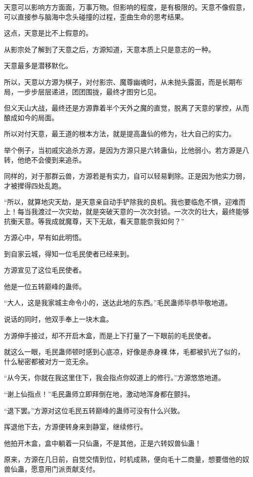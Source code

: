 \begin{this_body}
天意可以影响方方面面，万事万物。但影响的程度，是有极限的。天意不像假意，可以直接参与脑海中念头碰撞的过程，歪曲生命的思考结果。

这点，天意是比不上假意的。

从影宗处了解到了天意之后，方源知道，天意本质上只是意志的一种。

天意最多是潜移默化。

所以，天意以方源为棋子，对付影宗、魔尊幽魂时，从未抛头露面，而是长期布局，一步步层层递进，团团围拢，最终才图穷匕见。

但义天山大战，最终还是方源靠着半个天外之魔的直觉，脱离了天意的掌控，从而酿成如今的局面。

所以对付天意，最王道的根本方法，就是提高蛊仙的修为，壮大自己的实力。

举个例子，当初戚灾追杀方源，是因为方源只是六转蛊仙，比他弱小。若方源是八转，他绝不会傻到来追杀。

同样的，对于那群云兽，方源若是有实力，自可以轻易剿除。正是因为他实力弱，才被撵得四处乱跑。

“所以，就算地灾天劫，是天意亲自动手铲除我的良机。我也要临危不惧，迎难而上！每当我渡过一次灾劫，就是突破天意的一次次封锁。一次次的壮大，最终能够抗衡天意。等我成就魔尊，天下无敌，看天意能奈我如何？”

方源心中，早有如此明悟。

到自家云城，得知一位毛民使者已经来到。

方源宣见了这位毛民使者。

他是一位五转巅峰的蛊师。

“大人，这是我家城主命令小的，送达此地的东西。”毛民蛊师毕恭毕敬地道。

说话的同时，他双手奉上一块木盒。

方源伸手接过，却不开启木盒，而是上下打量了一下眼前的毛民使者。

就这么一眼，毛民蛊师顿时感到心底凉，好像是赤身裸.体，毛都被扒光了似的，什么秘密都被对方一览无余。

“从今天，你就在我这里住下，我会指点你奴道上的修行。”方源悠悠地道。

“谢上仙指点！”毛民蛊师立即拜倒在地，激动地浑身都在颤抖。

“退下罢。”方源对这位毛民五转巅峰的蛊师可没有什么兴致。

挥退他下去，方源便转身来到静室，继续修行。

他拍开木盒，盒中躺着一只仙蛊，不是其他，正是六转奴兽仙蛊！

原来，方源在几日前，自觉交情到位，时机成熟，便向毛十二商量，想要借他的奴兽仙蛊，愿意用门派贡献支付。


\end{this_body}

